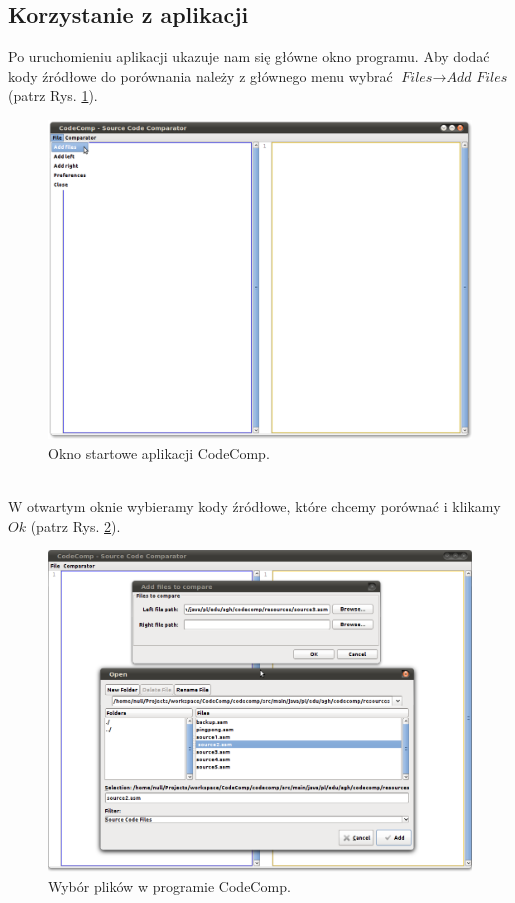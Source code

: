\documentclass[a4paper,12pt,twoside]{article}
\begin{document}
\newpage

\subsection{Korzystanie z aplikacji}

Po uruchomieniu aplikacji ukazuje nam się główne okno programu. Aby dodać kody źródłowe do porównania należy z głównego menu wybrać $\textit{Files} \rightarrow \textit{Add Files}$ (patrz Rys. \ref{fig:addfile}).
\begin{figure}[here]
\centering
\includegraphics[scale=0.25]{gfx/add_files.png}
\caption{Okno startowe aplikacji CodeComp.}
\label{fig:addfile}
\end{figure}
\\
W otwartym oknie wybieramy kody źródłowe, które chcemy porównać i klikamy $\textit{Ok}$ (patrz Rys. \ref{fig:ok}).
\begin{figure}[!]
\centering
\includegraphics[scale=0.25]{gfx/select_files.png}
\caption{Wybór plików w programie CodeComp.}
\label{fig:ok}
\end{figure}
\end{document}
